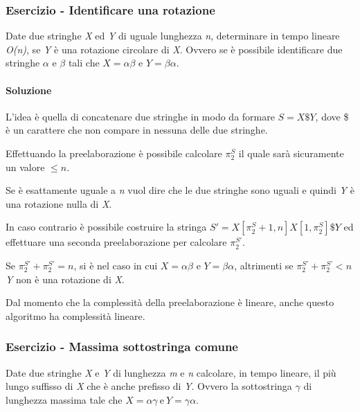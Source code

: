 \subsubsection{Esercizio - Identificare una rotazione}

Date due stringhe \textit{X} ed \textit{Y} di uguale lunghezza \textit{n}, determinare in tempo lineare \textit{O(n)}, se \textit{Y} è una rotazione circolare di \textit{X}.
Ovvero se è possibile identificare due stringhe $ \alpha $ e $ \beta $ tali che $ X = \alpha\beta $ e $ Y = \beta\alpha $.

\paragraph{Soluzione}

L'idea è quella di concatenare due stringhe in modo da formare $ S= X\$Y $, dove \$ è un carattere che non compare in nessuna delle due stringhe.

Effettuando la preelaborazione è possibile calcolare $ \pi_2^S $ il quale sarà sicuramente un valore $ \leq n $.

Se è esattamente uguale a \textit{n} vuol dire che le due stringhe sono uguali e quindi \textit{Y} è una rotazione nulla di \textit{X}.

In caso contrario è possibile costruire la stringa $ S' = X[\pi_2^S + 1,n] X[1, \pi_2^S]\$Y $ ed effettuare una seconda preelaborazione per calcolare $ \pi_2^{S'} $.

Se  $ \pi_2^{S'} + \pi_2^{S'}  = n   $, si è nel caso in cui $ X = \alpha\beta $ e $ Y = \beta\alpha $, altrimenti se $ \pi_2^{S'} + \pi_2^{S'}  < n $ \textit{Y} non è una rotazione di \textit{X}.

Dal momento che la complessità della preelaborazione è lineare, anche questo algoritmo ha complessità lineare.


\subsubsection{Esercizio - Massima sottostringa comune}

Date due stringhe \textit{X} e \textit{Y} di lunghezza \textit{m} e \textit{n} calcolare, in tempo lineare, il più lungo suffisso di \textit{X} che è anche prefisso di \textit{Y}. 
Ovvero la sottostringa $ \gamma $ di lunghezza massima tale che $ X = \alpha\gamma \: \text{e} \: Y = \gamma\alpha$.

